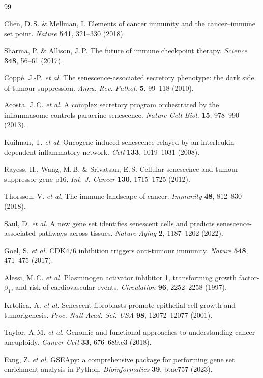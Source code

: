 \documentclass[10pt,twocolumn]{article}
\begin{document}
\begin{thebibliography}{99}
\fontsize{7.5}{10}\selectfont

Chen, D.\,S. \& Mellman, I. Elements of cancer immunity and the
cancer--immune set point. \textit{Nature} \textbf{541}, 321--330 (2018).

Sharma, P. \& Allison, J.\,P. The future of immune checkpoint therapy.
\textit{Science} \textbf{348}, 56--61 (2017).

Copp{\'e}, J.-P. \textit{et al.} The senescence-associated secretory
phenotype: the dark side of tumour suppression.
\textit{Annu. Rev. Pathol.} \textbf{5}, 99--118 (2010).

Acosta, J.\,C. \textit{et al.} A complex secretory program orchestrated
by the inflammasome controls paracrine senescence.
\textit{Nature Cell Biol.} \textbf{15}, 978--990 (2013).

Kuilman, T. \textit{et al.} Oncogene-induced senescence relayed by an
interleukin-dependent inflammatory network.
\textit{Cell} \textbf{133}, 1019--1031 (2008).

Rayess, H., Wang, M.\,B. \& Srivatsan, E.\,S. Cellular senescence and
tumour suppressor gene p16.
\textit{Int. J. Cancer} \textbf{130}, 1715--1725 (2012).

Thorsson, V. \textit{et al.} The immune landscape of cancer.
\textit{Immunity} \textbf{48}, 812--830 (2018).

Saul, D. \textit{et al.} A new gene set identifies senescent cells and
predicts senescence-associated pathways across tissues.
\textit{Nature Aging} \textbf{2}, 1187--1202 (2022).

Goel, S. \textit{et al.} CDK4/6 inhibition triggers anti-tumour
immunity. \textit{Nature} \textbf{548}, 471--475 (2017).

Alessi, M.\,C. \textit{et al.} Plasminogen activator inhibitor 1,
transforming growth factor-$\beta_1$, and risk of cardiovascular events.
\textit{Circulation} \textbf{96}, 2252--2258 (1997).

Krtolica, A. \textit{et al.} Senescent fibroblasts promote epithelial
cell growth and tumorigenesis.
\textit{Proc. Natl Acad. Sci. USA} \textbf{98}, 12072--12077 (2001).

Taylor, A.\,M. \textit{et al.} Genomic and functional approaches to
understanding cancer aneuploidy.
\textit{Cancer Cell} \textbf{33}, 676--689.e3 (2018).

Fang, Z. \textit{et al.} GSEApy: a comprehensive package for performing
gene set enrichment analysis in Python.
\textit{Bioinformatics} \textbf{39}, btac757 (2023).

\end{thebibliography}
\end{document}
